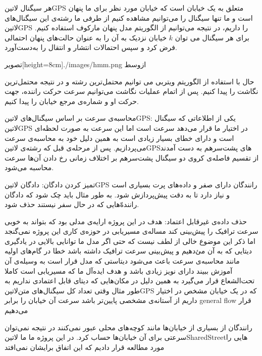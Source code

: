 هر سیگنال ‌لاتین{GPS} متعلق به یک خیابان است که خیابان مورد نظر برای ما پنهان است و ما تنها سیگنال را می‌توانیم مشاهده کنیم
از طرفی ما رشته‌ی این سیگنال‌های ‌لاتین{GPS} را داریم، در نتیجه می‌توانیم از الگوریتم مدل پنهان مارکوف  استفاده کنیم.
برای هر سیگنال می توان $k$ خیابان نزدیک به آن را به عنوان حالت‌های پنهان احتمالی فرض کرد و سپس احتمالات انتشار و انتقال را به‌دست‌آورد.

  ‌تصویر[height=8cm]{./images/hmm.png}
  ‌ازوسط

حال با استفاده از الگوریتم ویتربی می توانیم محتمل‌ترین رشته و در نتیجه محتمل‌ترین نگاشت را پیدا کنیم.
پس از اتمام عملیات نگاشت می‌توانیم سرعت حرکت راننده، جهت حرکت او و شماره‌ی مرجع خیابان  را پیدا کنیم.

 محاسبه‌ی سرعت بر اساس سیگنال‌های ‌لاتین{GPS}: یکی از اطلاعاتی که سیگنال ‌لاتین{GPS} در اختیار ما قرار می‌دهد سرعت است اما این سرعت به صورت لحظه‌ای است و دارای خطای بسیار زیادی است به همین دلیل خود به محاسبه‌ی سرعت می‌پردازیم. پس از مرحله‌ی قبل که رشته‌ی ‌لاتین{GPS}های پشت‌سر‌هم به دست آمدند از تقسیم فاصله‌ی کروی دو سیگنال پشت‌سر‌هم بر اختلاف زمانی رخ دادن آن‌ها سرعت محاسبه می‌شود.


 تمیز کردن دادگان: دادگان ‌لاتین{GPS} رانندگان دارای صفر و داده‌های پرت بسیاری است و نیاز دارد تا به دقت پیش‌پردازش شود. به طور مثال باید چک شود که دادگان راننده‌ّهایی که در حال سفر نیستند حذف شود.

 حذف داده‌ی غیرقابل اعتماد: هدف در این پروژه ارایه‌ی مدلی بود که بتواند به خوبی سرعت ترافیک را پیش‌بینی کند مساله‌ی مسیریابی در حوزه‌ی کاری این پروژه نمی‌گنجد اما ذکر این موضوع خالی از لطف نیست که حتی اگر مدل ما توانایی بالایی در یادگیری دیتایی که به آن می‌ٔدهیم و پیش‌بینی سرعت ترافیک داشته باشد خطا در گام‌های اولیه مانند محاسبه‌ی سرعت باعث می‌شود دیتاستی که مدل قرار است به وسیله‌ی آن آموزش ببیند دارای نویز زیادی باشد و هدف ایده‌آل ما که مسیریابی است کاملا تحت‌الشعاع قرار می‌گیرد به همین دلیل در مکان‌هایی که دیتای قابل اعتمادی نداریم به طور مثال وقتی تعداد کل سیگنال‌های متن‌لاتین{GPS} که در یک خیابان مشخص در اختیار داریم از آستانه‌ی مشخصی پایین‌تر باشد سرعت آن خیابان را برابر general flow قرار می‌دهیم

 رانندگان از بسیاری از خیابان‌ها مانند کوچه‌های محلی  عبور نمی‌کنند در نتیجه نمی‌توان سرعتی برای آن خیابان‌ها حساب کرد. در این پروژه ما ما ‌لاتین{SharedStreet}‌هایی را مورد مطالعه قرار دادیم که این اتفاق برایشان نمی‌افتد

